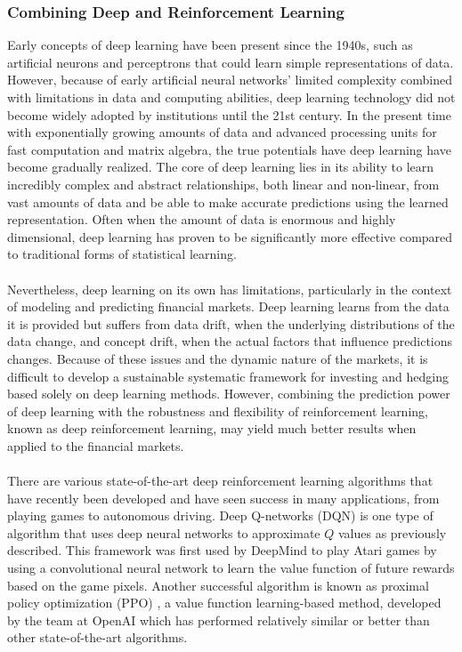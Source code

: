 \subsubsection{Combining Deep and Reinforcement Learning}
Early concepts of deep learning have been present since the 1940s, such as artificial neurons and perceptrons that could learn simple representations of data. However, because of early artificial neural networks' limited complexity combined with limitations in data and computing abilities, deep learning technology did not become widely adopted by institutions until the 21st century. In the present time with exponentially growing amounts of data and advanced processing units for fast computation and matrix algebra, the true potentials have deep learning have become gradually realized. The core of deep learning lies in its ability to learn incredibly complex and abstract relationships, both linear and non-linear, from vast amounts of data and be able to make accurate predictions using the learned representation. Often when the amount of data is enormous and highly dimensional, deep learning has proven to be significantly more effective compared to traditional forms of statistical learning.
\\ \\
Nevertheless, deep learning on its own has limitations, particularly in the context of modeling and predicting financial markets. Deep learning learns from the data it is provided but suffers from data drift, when the underlying distributions of the data change, and concept drift, when the actual factors that influence predictions changes. Because of these issues and the dynamic nature of the markets, it is difficult to develop a sustainable systematic framework for investing and hedging based solely on deep learning methods. However, combining the prediction power of deep learning with the robustness and flexibility of reinforcement learning, known as deep reinforcement learning, may yield much better results when applied to the financial markets.
\\ \\
There are various state-of-the-art deep reinforcement learning algorithms that have recently been developed and have seen success in many applications, from playing games to autonomous driving. Deep Q-networks (DQN) is one type of algorithm that uses deep neural networks to approximate $Q$ values as previously described. This framework was first used by DeepMind \cite{dqn} to play Atari games by using a convolutional neural network to learn the value function of future rewards based on the game pixels. Another successful algorithm is known as proximal policy optimization (PPO) \cite{ppo}, a value function learning-based method, developed by the team at OpenAI which has performed relatively similar or better than other state-of-the-art algorithms.
